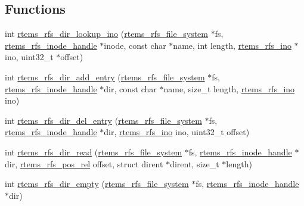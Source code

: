 \subsection*{Functions}
\begin{DoxyCompactItemize}
\item 
int \mbox{\hyperlink{rtems-rfs-dir_8c_a925d23dfc36f8f42bdb373855f94c226}{rtems\+\_\+rfs\+\_\+dir\+\_\+lookup\+\_\+ino}} (\mbox{\hyperlink{struct__rtems__rfs__file__system}{rtems\+\_\+rfs\+\_\+file\+\_\+system}} $\ast$fs, \mbox{\hyperlink{rtems-rfs-inode_8h_a91f02dac5a2d91e072d676f3266ab8d2}{rtems\+\_\+rfs\+\_\+inode\+\_\+handle}} $\ast$inode, const char $\ast$name, int length, \mbox{\hyperlink{rtems-rfs-inode_8h_ae658325c3ff9941f2e68315d20e3c723}{rtems\+\_\+rfs\+\_\+ino}} $\ast$ino, uint32\+\_\+t $\ast$offset)
\item 
int \mbox{\hyperlink{rtems-rfs-dir_8c_a8b0d72704a836e92be9211cd27b50aab}{rtems\+\_\+rfs\+\_\+dir\+\_\+add\+\_\+entry}} (\mbox{\hyperlink{struct__rtems__rfs__file__system}{rtems\+\_\+rfs\+\_\+file\+\_\+system}} $\ast$fs, \mbox{\hyperlink{rtems-rfs-inode_8h_a91f02dac5a2d91e072d676f3266ab8d2}{rtems\+\_\+rfs\+\_\+inode\+\_\+handle}} $\ast$dir, const char $\ast$name, size\+\_\+t length, \mbox{\hyperlink{rtems-rfs-inode_8h_ae658325c3ff9941f2e68315d20e3c723}{rtems\+\_\+rfs\+\_\+ino}} ino)
\item 
int \mbox{\hyperlink{rtems-rfs-dir_8c_a50190aa71ba1a3d42d0dcd2b37095c5f}{rtems\+\_\+rfs\+\_\+dir\+\_\+del\+\_\+entry}} (\mbox{\hyperlink{struct__rtems__rfs__file__system}{rtems\+\_\+rfs\+\_\+file\+\_\+system}} $\ast$fs, \mbox{\hyperlink{rtems-rfs-inode_8h_a91f02dac5a2d91e072d676f3266ab8d2}{rtems\+\_\+rfs\+\_\+inode\+\_\+handle}} $\ast$dir, \mbox{\hyperlink{rtems-rfs-inode_8h_ae658325c3ff9941f2e68315d20e3c723}{rtems\+\_\+rfs\+\_\+ino}} ino, uint32\+\_\+t offset)
\item 
int \mbox{\hyperlink{rtems-rfs-dir_8c_a3487727e61e23fc3c551cc6cc49115f1}{rtems\+\_\+rfs\+\_\+dir\+\_\+read}} (\mbox{\hyperlink{struct__rtems__rfs__file__system}{rtems\+\_\+rfs\+\_\+file\+\_\+system}} $\ast$fs, \mbox{\hyperlink{rtems-rfs-inode_8h_a91f02dac5a2d91e072d676f3266ab8d2}{rtems\+\_\+rfs\+\_\+inode\+\_\+handle}} $\ast$dir, \mbox{\hyperlink{rtems-rfs-file-system_8h_af6bccb465dcd34c68e9f0c214950ef57}{rtems\+\_\+rfs\+\_\+pos\+\_\+rel}} offset, struct dirent $\ast$dirent, size\+\_\+t $\ast$length)
\item 
int \mbox{\hyperlink{rtems-rfs-dir_8c_a8347f100a80fdbfb9ba8bcb3aff40a38}{rtems\+\_\+rfs\+\_\+dir\+\_\+empty}} (\mbox{\hyperlink{struct__rtems__rfs__file__system}{rtems\+\_\+rfs\+\_\+file\+\_\+system}} $\ast$fs, \mbox{\hyperlink{rtems-rfs-inode_8h_a91f02dac5a2d91e072d676f3266ab8d2}{rtems\+\_\+rfs\+\_\+inode\+\_\+handle}} $\ast$dir)
\end{DoxyCompactItemize}


